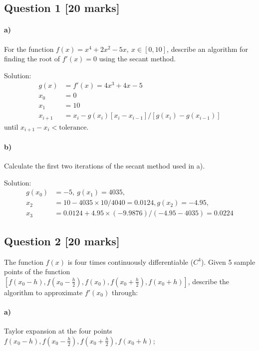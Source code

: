 \documentclass[11pt,a4paper,hidelinks,fleqn]{article}            %
\date{}
\begin{document}
\subsection*{Question 1 [20 marks]}

\paragraph{a)} For the function $f(x) = x^4 + 2 x^2 - 5x, ~x\in[0, 10]$,
describe an algorithm for finding the root of $f'(x) = 0$ using the secant method.

Solution:
\begin{align*}
g(x) & = f'(x) = 4x^3 + 4 x - 5 \\
x_0 & = 0 \\
x_1 & = 10 \\
x_{i+1} & = x_i - g(x_i) [x_i - x_{i-1}] / [g(x_i) - g(x_{i-1})]
\end{align*}
until $x_{i+1} - x_{i} < \text{tolerance}$.

\paragraph{b)} Calculate the first two iterations of the secant method used in a).

Solution:
\begin{align*}
g(x_0) & = -5, ~g(x_1) = 4035, \\
x_2 & = 10 - 4035 \times 10 / 4040 = 0.0124, g(x_2) = -4.95, \\
x_3 & = 0.0124 + 4.95 \times (-9.9876) / (-4.95 - 4035) = 0.0224
\end{align*}


\subsection*{Question 2 [20 marks]} 

The function $f(x)$ is four times continuously differentiable ($C^4$).
Given 5 sample points of the function $[f(x_0-h), f(x_0-\frac{h}{2}), f(x_0), f(x_0+\frac{h}{2}), f(x_0+h)]$,
describe the algorithm to approximate $f'(x_0)$ through:

\vspace{-6mm}
\paragraph{a)} Taylor expansion at the four points $f(x_0-h), f(x_0-\frac{h}{2}), f(x_0+\frac{h}{2}), f(x_0+h)$;
\end{document}
